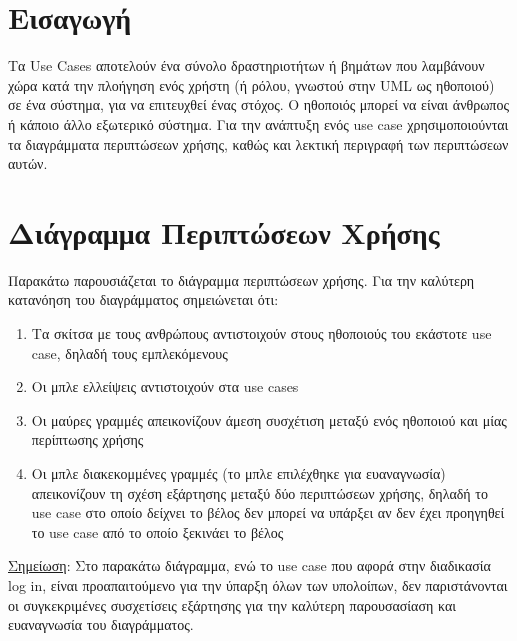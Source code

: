 \documentclass{article}
\begin{document}
{
  \hypersetup{linkcolor=black}
  \tableofcontents
}

\newpage

\section{Εισαγωγή}

Τα Use Cases αποτελούν ένα σύνολο δραστηριοτήτων ή βημάτων που λαμβάνουν χώρα κατά την πλοήγηση ενός χρήστη (ή ρόλου, γνωστού στην UML ως ηθοποιού) σε ένα σύστημα, για να επιτευχθεί ένας στόχος. Ο ηθοποιός μπορεί να είναι άνθρωπος ή κάποιο άλλο εξωτερικό σύστημα. 
Για την ανάπτυξη ενός use case χρησιμοποιούνται τα διαγράμματα περιπτώσεων χρήσης, καθώς και λεκτική περιγραφή των περιπτώσεων αυτών.

\section{Διάγραμμα Περιπτώσεων Χρήσης}

Παρακάτω παρουσιάζεται το διάγραμμα περιπτώσεων χρήσης. Για την καλύτερη κατανόηση του διαγράμματος σημειώνεται ότι:

\begin{enumerate}
  \item Τα σκίτσα με τους ανθρώπους αντιστοιχούν στους ηθοποιούς του εκάστοτε use case, δηλαδή τους εμπλεκόμενους
  \item Οι μπλε ελλείψεις αντιστοιχούν στα use cases
  \item Οι μαύρες γραμμές απεικονίζουν άμεση συσχέτιση μεταξύ ενός ηθοποιού και μίας περίπτωσης χρήσης
  \item Οι μπλε διακεκομμένες γραμμές (το μπλε επιλέχθηκε για ευαναγνωσία) απεικονίζουν τη σχέση εξάρτησης μεταξύ δύο περιπτώσεων χρήσης, δηλαδή το use case στο οποίο δείχνει το βέλος δεν μπορεί να υπάρξει αν δεν έχει προηγηθεί το use case από το οποίο ξεκινάει το βέλος  
\end{enumerate}


\underline{Σημείωση}: Στο παρακάτω διάγραμμα, ενώ το use case που αφορά στην διαδικασία log in, είναι προαπαιτούμενο για την ύπαρξη όλων των υπολοίπων, δεν παριστάνονται οι συγκεκριμένες συσχετίσεις εξάρτησης για την καλύτερη παρουσασίαση και ευαναγνωσία του διαγράμματος.

\newpage
\end{document}
